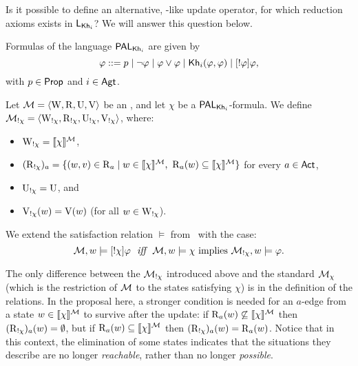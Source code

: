 Is it possible to define an alternative, \PAL-like update operator, for which reduction axioms exists in $\mathsf{L}_{{\sf Kh}_i}$? We will answer this question below.

\medskip 

\begin{definition}\label{def:pakhsyntax}
Formulas of the language $\mathsf{PAL}_{{\sf Kh}_i}$ are given by
\[
	\varphi ::= p \mid \neg\varphi \mid \varphi\vee\varphi \mid
{\sf Kh}_i(\varphi,\varphi)\mid [!\varphi]\varphi,
\]
with $p \in {\rm \sf Prop}$ and $i\in{\rm \sf Agt}$.
\end{definition}

\medskip 

\begin{definition}\label{def:annupdate}
Let $\mathcal{M} = \langle \operatorname{W}, \operatorname{R}, \operatorname{U}, \operatorname{V} \rangle$ be an \ults, and let $\chi$ be a $\mathsf{PAL}_{{\sf Kh}_i}$-formula. We define $\mathcal{M}_{!\chi} = \langle \operatorname{W}_{!\chi}, \operatorname{R}_{!\chi}, \operatorname{U}_{!\chi}, \operatorname{V}_{!\chi} \rangle$, where:
\begin{itemize}
\item $\operatorname{W}_{!\chi} = \llbracket \chi \rrbracket^{\mathcal{M}}$,
\item $(\operatorname{R}_{!\chi})_a = \{ (w,v) \in \operatorname{R}_a \mid w \in \llbracket \chi \rrbracket^{\mathcal{M}} \text{, } \operatorname{R}_a(w) \subseteq \llbracket \chi \rrbracket^{\mathcal{M}} \}$ for every $a \in {\rm \sf Act}$,
\item $\operatorname{U}_{!\chi} = \operatorname{U}$, and 
\item $\operatorname{V}_{!\chi}(w) = \operatorname{V}(w)$ (for all $w\in\operatorname{W}_{!\chi}$).
\end{itemize}

We extend the satisfaction relation $\models$ from~ with the case:
\[
	\mathcal{M},w \models [!\chi]\varphi \ \ \mbox{\it iff} \ \ \mathcal{M},w \models \chi \mbox{ implies } \mathcal{M}_{!\chi},w \models \varphi.
\]
\end{definition}

\medskip 

The only difference between the $\mathcal{M}_{!\chi}$ introduced above and the standard $\mathcal{M}_{\chi}$ (which is the restriction of $\mathcal{M}$ to the states satisfying $\chi$) is in the
definition of the relations. In the proposal here, a stronger condition is needed for an $a$-edge from a state $w \in \llbracket \chi \rrbracket^{\mathcal{M}}$ to survive after the update: if $\operatorname{R}_a(w) \not \subseteq \llbracket \chi \rrbracket^{\mathcal{M}}$ then $(\operatorname{R}_{!\chi})_a(w) = \emptyset$, but if $\operatorname{R}_a(w) \subseteq \llbracket \chi \rrbracket^{\mathcal{M}}$ then $(\operatorname{R}_{!\chi})_a(w) = \operatorname{R}_a(w)$. Notice that in this context, the elimination of some states indicates that the situations they describe are no longer \emph{reachable}, rather than no longer \emph{possible}.

